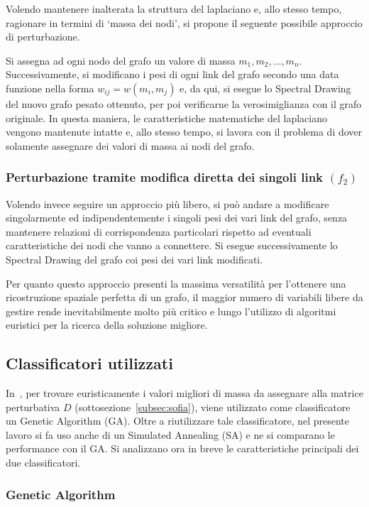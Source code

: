 \documentclass[10pt,a4paper]{article}
\begin{document}
Volendo mantenere inalterata la struttura del laplaciano e, allo stesso tempo, ragionare in termini di `massa dei nodi', si propone il seguente possibile approccio di perturbazione.

Si assegna ad ogni nodo del grafo un valore di massa \(m_1, m_2, \dots, m_n\).
Successivamente, si modificano i pesi di ogni link del grafo secondo una data funzione nella forma \(w_{ij} = w(m_i, m_j)\) e, da qui, si esegue lo Spectral Drawing del nuovo grafo pesato ottenuto, per poi verificarne la verosimiglianza con il grafo originale.
In questa maniera, le caratteristiche matematiche del laplaciano vengono mantenute intatte e, allo stesso tempo, si lavora con il problema di dover solamente assegnare dei valori di massa ai nodi del grafo.

\subsubsection{Perturbazione tramite modifica diretta dei singoli link \((f_2)\)}

Volendo invece seguire un approccio più libero, si può andare a modificare singolarmente ed indipendentemente i singoli pesi dei vari link del grafo, senza mantenere relazioni di corrispondenza particolari rispetto ad eventuali caratteristiche dei nodi che vanno a connettere.
Si esegue successivamente lo Spectral Drawing del grafo coi pesi dei vari link modificati.

Per quanto questo approccio presenti la massima versatilità per l'ottenere una ricostruzione spaziale perfetta di un grafo, il maggior numero di variabili libere da gestire rende inevitabilmente molto più critico e lungo l'utilizzo di algoritmi euristici per la ricerca della soluzione migliore.

\subsection{Classificatori utilizzati}

In~\cite{tesi_sofia_farina}, per trovare euristicamente i valori migliori di massa da assegnare alla matrice perturbativa \(D\) (sottosezione~\ref{subsec:sofia}), viene utilizzato come classificatore un Genetic Algorithm (GA).
Oltre a riutilizzare tale classificatore, nel presente lavoro si fa uso anche di un Simulated Annealing (SA) e ne si comparano le performance con il GA.
Si analizzano ora in breve le caratteristiche principali dei due classificatori.

\subsubsection{Genetic Algorithm}
\end{document}

